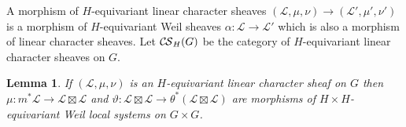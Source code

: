 \documentclass[10pt]{amsart}
\theoremstyle{plain}
\newtheorem{lemma}[theorem]{Lemma}
\theoremstyle{definition}
\newcommand{\cs}[1]{{\mathcal{#1}}}
\newcommand{\CS}{{\mathcal{C\hskip-0.8pt S}}}
\begin{document}
A morphism of $H$-equivariant linear character sheaves $(\cs{L},\mu,\nu) \to (\cs{L}',\mu',\nu')$ is a morphism of $H$-equivariant Weil sheaves $\alpha : \cs{L}\to \cs{L}'$ which is also a morphism of linear character sheaves.
%
Let $\CS_H(G)$ be the category of $H$-equivariant linear character sheaves on $G$.





\begin{lemma}\label{lem:HH}
If $(\cs{L},\mu,\nu)$ is an $H$-equivariant linear character sheaf on $G$ then $\mu : m^*\cs{L} \to \cs{L}\boxtimes \cs{L}$ and $\vartheta : \cs{L}\boxtimes \cs{L} \to \theta^*(\cs{L}\boxtimes \cs{L})$ are morphisms of $H\times H$-equivariant Weil local systems on $G\times G$. 
\end{lemma}
\end{document}
